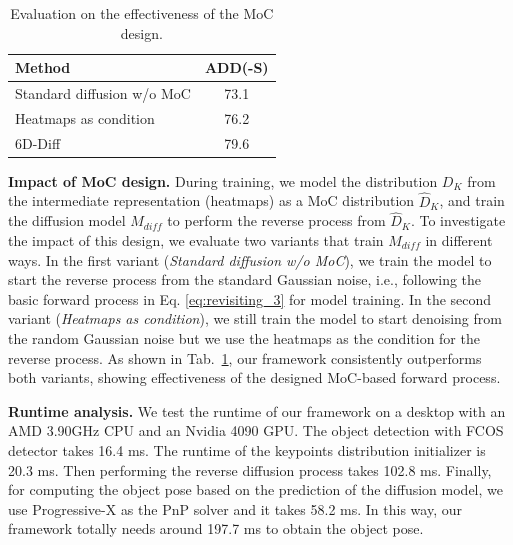 \documentclass[10pt,twocolumn,letterpaper]{article}
\begin{document}
\begin{table}
\vspace{-0.4cm}
\caption{Evaluation on the effectiveness of the MoC design.}
\vspace{-0.35cm}
\resizebox{0.6\columnwidth}{!}
{
\small
\begin{tabular}{l|c}
\hline
Method & ADD(-S)\\
\hline
Standard diffusion w/o MoC & 73.1\\
Heatmaps as condition & 76.2\\
\hline
6D-Diff & 79.6\\
\hline
\end{tabular}}
\label{Tab:ablation_study_2}
\end{table}

\noindent\textbf{Impact of MoC design.} 
During training, we model the distribution $D_K$ from the intermediate representation (heatmaps) as a MoC distribution $\hat{D}_K$, and train the diffusion model $M_{diff}$ to perform the reverse process from $\hat{D}_K$. 
To investigate the impact of this design, we evaluate two variants that train $M_{diff}$ in different ways.
In the first variant (\textit{Standard diffusion w/o MoC}), 
we train the model to start the reverse process from the standard Gaussian noise, i.e., following the basic forward process in Eq. \ref{eq:revisiting_3} for model training.
In the second variant (\textit{Heatmaps as condition}), we still train the model to start denoising from the random Gaussian noise but we use the heatmaps as the condition for the reverse process.
As shown in Tab.~\ref{Tab:ablation_study_2}, our framework consistently outperforms both variants, showing effectiveness of the designed MoC-based forward process.

\setlength{\columnsep}{0.3125in}
\noindent\textbf{Runtime analysis.}
We test the runtime of our framework on a desktop with an AMD 3.90GHz CPU and an Nvidia 4090 GPU.
The object detection with FCOS detector \cite{tian2019fcos} takes 16.4 ms.
The runtime of the keypoints distribution initializer is 20.3 ms.
Then performing the reverse diffusion process takes 102.8 ms. 
Finally, for computing the object pose based on the prediction of the diffusion model, we use Progressive-X \cite{barath2019progressive} as the PnP solver and it takes 58.2 ms.
In this way, our framework totally needs around 197.7 ms to obtain the object pose. 
\end{document}

